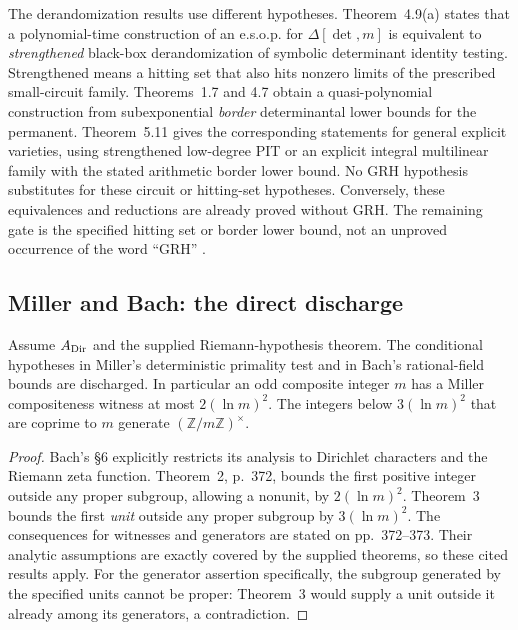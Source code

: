 The derandomization results use different hypotheses.  Theorem~4.9(a) states
that a polynomial-time construction of an e.s.o.p. for
\(\Delta[\det,m]\) is equivalent to \emph{strengthened} black-box
derandomization of symbolic determinant identity testing.  Strengthened
means a hitting set that also hits nonzero limits of the prescribed
small-circuit family.  Theorems~1.7 and 4.7 obtain a quasi-polynomial
construction from subexponential \emph{border} determinantal lower bounds
for the permanent.  Theorem~5.11 gives the corresponding statements for
general explicit varieties, using strengthened low-degree PIT or an
explicit integral multilinear family with the stated arithmetic border
lower bound.  No GRH hypothesis substitutes for these circuit or hitting-set
hypotheses.  Conversely, these equivalences and reductions are already
proved without GRH.  The remaining gate is the specified hitting set or
border lower bound, not an unproved occurrence of the word ``GRH''
\cite[Theorems~1.7, 4.7, 4.9, 5.11]{CGCTV}.

\subsection{Miller and Bach: the direct discharge}

\begin{proposition}
Assume \(A_{\rm Dir}\) and the supplied Riemann-hypothesis theorem.
The conditional hypotheses in Miller's deterministic primality test and in
Bach's rational-field bounds are discharged.  In particular an odd
composite integer \(m\) has a Miller compositeness witness at most
\(2(\ln m)^2\).  The integers below \(3(\ln m)^2\) that are coprime to
\(m\) generate \((\mathbb Z/m\mathbb Z)^\times\).
\end{proposition}
\begin{proof}
Bach's \S6 explicitly restricts its analysis to Dirichlet characters and
the Riemann zeta function.  Theorem~2, p.~372, bounds the first positive
integer outside any proper subgroup, allowing a nonunit, by
\(2(\ln m)^2\).  Theorem~3 bounds the first \emph{unit} outside any
proper subgroup by \(3(\ln m)^2\).  The consequences for witnesses and
generators are stated on pp.~372--373.  Their analytic assumptions are
exactly covered by the supplied theorems, so these cited results apply.
For the generator assertion specifically, the subgroup generated by the
specified units cannot be proper: Theorem~3 would supply a unit outside
it already among its generators, a contradiction.
\end{proof}


